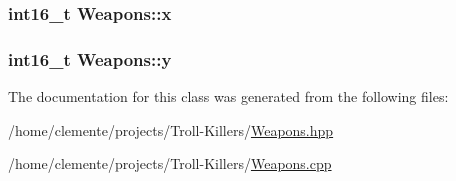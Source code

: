 \subsubsection[{x}]{\setlength{\rightskip}{0pt plus 5cm}int16\+\_\+t Weapons\+::x\hspace{0.3cm}{\ttfamily [protected]}}\label{class_weapons_af9bcea79386a27736973ae767ef8a408}
\hypertarget{class_weapons_a35ff8124c657cb744f6d2731b1ec6e83}{}
\subsubsection[{y}]{\setlength{\rightskip}{0pt plus 5cm}int16\+\_\+t Weapons\+::y\hspace{0.3cm}{\ttfamily [protected]}}\label{class_weapons_a35ff8124c657cb744f6d2731b1ec6e83}


The documentation for this class was generated from the following files\+:\begin{DoxyCompactItemize}
\item 
/home/clemente/projects/\+Troll-\/\+Killers/\hyperlink{_weapons_8hpp}{Weapons.\+hpp}\item 
/home/clemente/projects/\+Troll-\/\+Killers/\hyperlink{_weapons_8cpp}{Weapons.\+cpp}\end{DoxyCompactItemize}
